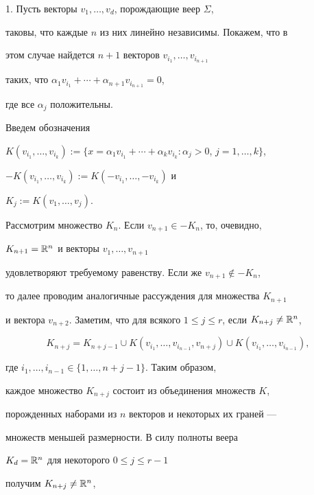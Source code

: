 \begin{pf}


1. Пусть векторы $v_1,\dotsc,v_d$, порождающие веер $\Sigma$,


таковы, что каждые $n$ из них линейно независимы. Покажем, что в


этом случае найдется $n+1$ векторов $v_{i_1}, \dotsc,v_{i_{n+1}}$


таких, что $\alpha_1v_{i_1}+\dotsb+\alpha_{n+1} v_{i_{n+1}}=0$,


где все $\alpha_j$ положительны.





Введем обозначения


$K(v_{i_1},\dotsc,v_{i_k}):=\{x=\alpha_1v_{i_1}+\dotsb+\alpha_kv_{i_k}:


\alpha_j>0$, $j=1,\dotsc,k\}$,


$-K(v_{i_1},\dotsc,v_{i_k}):=K(-v_{i_1},\dotsc,-v_{i_k})$ и


$K_j:=K(v_1,\dotsc,v_j)$.





Рассмотрим множество $K_n$. Если $v_{n+1}\in -K_n$, то, очевидно,


$K_{n+1}=\Bbb{R}^n$ и векторы $v_1,\dotsc,v_{n+1}$


удовлетворяют требуемому равенству. Если же $v_{n+1}\notin -K_n$,


то далее проводим аналогичные рассуждения для множества $K_{n+1}$


и вектора $v_{n+2}$. Заметим, что для всякого $1\leqslant


j\leqslant r$, если $K_{n+j}\neq \Bbb{R}^n$,


$$


K_{n+j}=K_{n+j-1}\cup K(v_{i_1},\dotsc,v_{i_{n-1}},v_{n+j})\cup


K(v_{i_1},\dotsc,v_{i_{n-1}}),


$$


где $i_1,\dotsc,i_{n-1}\in\{1,\dotsc,n+j-1\}$. Таким образом,


каждое множество $K_{n+j}$ состоит из объединения множеств $K$,


порожденных наборами из $n$ векторов и некоторых их граней ---


множеств меньшей размерности. В силу полноты веера 


$K_d=\Bbb{R}^n$ для некоторого $0\leqslant j\leqslant r-1$


получим $K_{n+j}\neq\Bbb{R}^n$,  



\end{pf}
